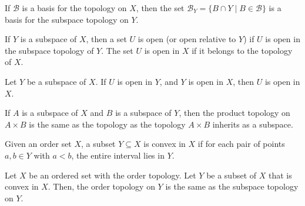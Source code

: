 \documentclass{article}
\newcommand{\B}{\mathcal B}
\begin{document}
\medskip{}

    If $\B$ is a basis for the topology on $X$, then the set $\B_Y = \{B \cap Y \mid B \in \B\}$ is a basis for the subspace topology on $Y$.

\medskip{}

    If $Y$ is a subspace of $X$, then a set $U$ is open (or open relative to $Y$) if $U$ is open in the subspace topology of $Y$. The set $U$ is open in $X$ if it belongs to the topology of $X$.

\medskip{}

    Let $Y$ be a subspace of $X$. If $U$ is open in $Y$, and $Y$ is open in $X$, then $U$ is open in $X$.

\medskip{}

    If $A$ is a subspace of $X$ and $B$ is a subspace of $Y$, then the product topology on $A \times B$ is the same as the topology as the topology $A \times B$ inherits as a subspace.

\medskip{}

    Given an order set $X$, a subset $Y \subseteq X$ is convex in $X$ if for each pair of points $a,b \in Y$ with $a<b$, the entire interval lies in $Y$.

\medskip{}

    Let $X$ be an ordered set with the order topology.
    Let $Y$ be a subset of $X$ that is convex in $X$.
    Then, the order topology on $Y$ is the same as the subspace topology on $Y$.
\end{document}

